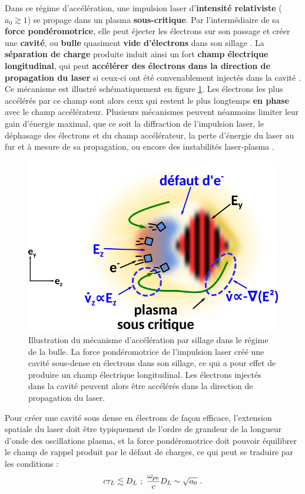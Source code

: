 \begin{refsection}
Dans ce régime d'accélération, une impulsion laser d'\textbf{intensité relativiste} ($a_0 \gtrsim 1$) se propage dans un plasma \textbf{sous-critique}. Par l'intermédiaire de sa \textbf{force pondéromotrice}, elle peut éjecter les électrons sur son passage et créer une \textbf{cavité}, ou \textbf{bulle} quasiment \textbf{vide d'électrons} dans son sillage \parencite{pukhov_2002}. La \textbf{séparation de charge} produite induit ainsi un fort \textbf{champ électrique longitudinal}, qui peut \textbf{accélérer des électrons dans la direction de propagation du laser} si ceux-ci ont été convenablement injectés dans la cavité \parencite{pukhov_2002, esarey_2009}. Ce mécanisme est illustré schématiquement en figure \ref{fig:2-acceleration_sillage}. Les électrons les plus accélérés par ce champ sont alors ceux qui restent le plus longtemps \textbf{en phase} avec le champ accélérateur. Plusieurs mécanismes peuvent néanmoins limiter leur gain d'énergie maximal, que ce soit la diffraction de l'impulsion laser, le déphasage des électrons et du champ accélérateur, la perte d'énergie du laser au fur et à mesure de sa propagation, ou encore des instabilités laser-plasma \parencite{esarey_2009}.

\begin{figure}[hbtp]
    \centering
    \includegraphics[width=0.7\linewidth]{2-laser/acceleration_sillage_bulle.png}
    \caption{Illustration du mécanisme d'accélération par sillage dans le régime de la bulle. La force pondéromotrice de l'impulsion laser créé une cavité sous-dense en électrons dans son sillage, ce qui a pour effet de produire un champ électrique longitudinal. Les électrons injectés dans la cavité peuvent alors être accélérés dans la direction de propagation du laser.}
    \label{fig:2-acceleration_sillage}
\end{figure}

Pour créer une cavité sous dense en électrons de façon efficace, l'extension spatiale du laser doit être typiquement de l'ordre de grandeur de la longueur d'onde des oscillations plasma, et la force pondéromotrice doit pouvoir équilibrer le champ de rappel produit par le défaut de charges, ce qui peut se traduire par les conditions \parencite{esarey_2009, gordienko_2005} :
\begin{equation}
    c \tau_L \lesssim D_L ~ ; ~ \dfrac{\omega_{pe}}{c} D_L \sim \sqrt{a_0} ~ \rm .
    \label{eq:2-parametres_bulle}
\end{equation}


\end{refsection}
